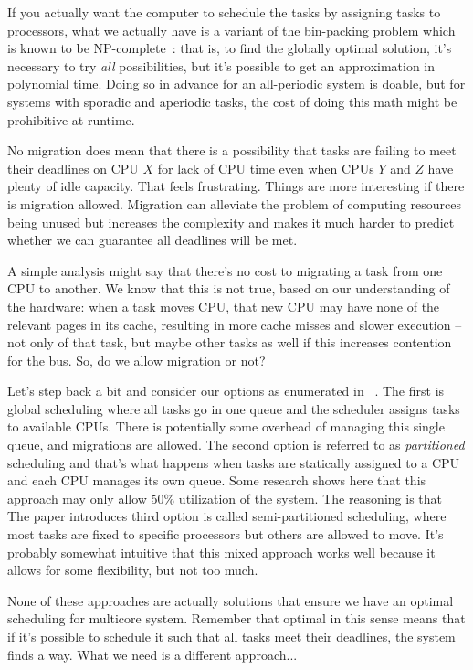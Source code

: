 If you actually want the computer to schedule the tasks by assigning tasks to processors, what we actually have is a variant of the bin-packing problem which is known to be NP-complete~\cite{sa-rt}: that is, to find the globally optimal solution, it's necessary to try \textit{all} possibilities, but it's possible to get an approximation in polynomial time. Doing so in advance for an all-periodic system is doable, but for systems with sporadic and aperiodic tasks, the cost of doing this math might be prohibitive at runtime. 

No migration does mean that there is a possibility that tasks are failing to meet their deadlines on CPU $X$ for lack of CPU time even when CPUs $Y$ and $Z$ have plenty of idle capacity. That feels frustrating. Things are more interesting if there is migration allowed. Migration can alleviate the problem of computing resources being unused but increases the complexity and makes it much harder to predict whether we can guarantee all deadlines will be met. 

A simple analysis might say that there's no cost to migrating a task from one CPU to another. We know that this is not true, based on our understanding of the hardware: when a task moves CPU, that new CPU may have none of the relevant pages in its cache, resulting in more cache misses and slower execution -- not only of that task, but maybe other tasks as well if this increases contention for the bus. So, do we allow migration or not?

Let's step back a bit and consider our options as enumerated in ~\cite{globalrts}. The first is global scheduling where all tasks go in one queue and the scheduler assigns tasks to available CPUs. There is potentially some overhead of managing this single queue, and migrations are allowed. The second option is referred to as \textit{partitioned} scheduling and that's what happens when tasks are statically assigned to a CPU and each   CPU manages its own queue. Some research shows here that this approach may only allow 50\% utilization of the system. The reasoning is that The paper introduces third option is called semi-partitioned scheduling, where most tasks are fixed to specific processors but others are allowed to move. It's probably somewhat intuitive that this mixed approach works well because it allows for some flexibility, but not too much.

None of these approaches are actually solutions that ensure we have an optimal scheduling for multicore system. Remember that optimal in this sense means that if it's possible to schedule it such that all tasks meet their deadlines, the system finds a way. What we need is a different approach...


